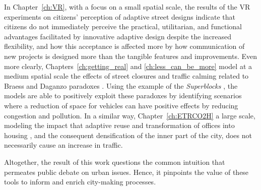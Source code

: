 
In Chapter~\ref{ch:VR}, with a focus on a small spatial scale, the results of the  VR experiments on citizens' perception of adaptive street designs indicate that citizens do not immediately perceive the practical, utilitarian, and functional advantages facilitated by innovative adaptive design despite the increased flexibility, and how this acceptance is affected more by how communication of new projects is designed more than the tangible features and improvements. Even more clearly, Chapters~\ref{ch:getting_real} and \ref{ch:less_can_be_more} model at a medium spatial scale the effects of street closures and traffic calming related to Braess and Daganzo paradoxes \citep{Braess1969,Sheffi1978}. Using the example of the \emph{Superblocks} \citep{Rueda2018}, the models are able to positively exploit these paradoxes by identifying scenarios where a reduction of space for vehicles can have positive effects by reducing congestion and pollution. In a similar way, Chapter~\ref{ch:ETRCO2H} a large scale, modeling the impact that adaptive reuse and transformation of offices into housing \citep{Remy2014, Pratiwi2023}, and the consequent densification of the inner part of the city, does not necessarily cause an increase in traffic.

Altogether, the result of this work questions the common intuition that permeates public debate on urban issues. Hence, it pinpoints the value of these tools to inform and enrich city-making processes.




